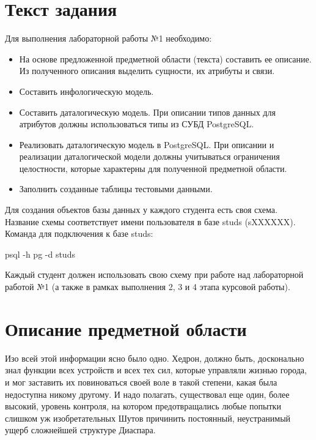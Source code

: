 \section {Текст задания}
Для выполнения лабораторной работы №1 необходимо:
\begin{itemize}

	\item На основе предложенной предметной области (текста) составить ее описание. Из полученного описания выделить сущности, их атрибуты и связи.
	\item Составить инфологическую модель.
	\item Составить даталогическую модель. При описании типов данных для атрибутов должны использоваться типы из СУБД PostgreSQL.
	\item Реализовать даталогическую модель в PostgreSQL. При описании и реализации даталогической модели должны учитываться ограничения целостности, которые характерны для полученной предметной области.
	\item Заполнить созданные таблицы тестовыми данными. 
\end{itemize}
Для создания объектов базы данных у каждого студента есть своя схема. Название схемы соответствует имени пользователя в базе studs (sXXXXXX). Команда для подключения к базе studs:

psql -h pg -d studs

Каждый студент должен использовать свою схему при работе над лабораторной работой №1 (а также в рамках выполнения 2, 3 и 4 этапа курсовой работы).

\section {Описание предметной области}
Изо всей этой информации ясно было одно. Хедрон, должно быть, досконально знал функции всех устройств и всех тех сил, которые управляли жизнью города, и мог заставить их повиноваться своей воле в такой степени, какая была недоступна никому другому. И надо полагать, существовал еще один, более высокий, уровень контроля, на котором предотвращались любые попытки слишком уж изобретательных Шутов причинить постоянный, неустранимый ущерб сложнейшей структуре Диаспара.

